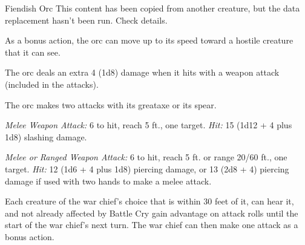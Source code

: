 \documentclass[10pt,a4paper,twoside,bg=print,twocolumn,openany,nodeprecatedcode]{dndbook}
\begin{document}
\begin{DndMonster}[float=t]{Fiendish Orc}
\DndMonsterBasics[
armor-class = {16 (\textit{chain mail})},
hit-points = {\DndDice{11d8 + 44}},
speed = {30 ft.}
]
\DndMonsterAbilityScores[
 str = 18,
 dex = 12,
 con = 18,
 int = 11,
 wis = 11,
 cha = 16
]
\DndMonsterDetails[
saving-throws = {Str +6, Con +6, Wis +2},
skills = {Intimidation +5},
senses = {darkvision 60 ft., passive perception 10},
languages = {Common, Orc},
challenge = 4,
]
This content has been copied from another creature, but the data replacement hasn't been run. Check details.

As a bonus action, the orc can move up to its speed toward a hostile creature that it can see.

The orc deals an extra 4 (1d8) damage when it hits with a weapon attack (included in the attacks).

The orc makes two attacks with its greataxe or its spear.

\textsl{Melee Weapon Attack:} 6 to hit, reach 5 ft., one target. \textsl{Hit:} 15 (1d12 + 4 plus 1d8) slashing damage.

\textsl{Melee or Ranged Weapon Attack:} 6 to hit, reach 5 ft. or range 20/60 ft., one target. \textsl{Hit:} 12 (1d6 + 4 plus 1d8) piercing damage, or 13 (2d8 + 4) piercing damage if used with two hands to make a melee attack.

Each creature of the war chief's choice that is within 30 feet of it, can hear it, and not already affected by Battle Cry gain advantage on attack rolls until the start of the war chief's next turn. The war chief can then make one attack as a bonus action.

\end{DndMonster}
\end{document}
